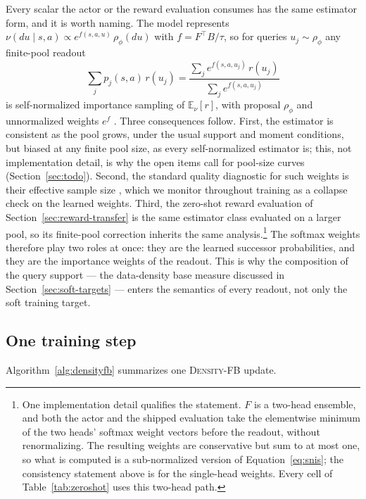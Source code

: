 \documentclass{article}
\newcommand{\E}{\mathbb{E}}
\newcommand{\DensityFB}{\textsc{Density-FB}}
\begin{document}
Every scalar the actor or the reward evaluation consumes has the same estimator form, and it is worth naming.
The model represents $\nu(du\mid s,a) \propto e^{f(s,a,u)}\,\rho_\phi(du)$ with $f=F^\top B/\tau$, so for queries $u_j\sim\rho_\phi$ any finite-pool readout
\begin{equation}
\label{eq:snis}
\sum_j p_j(s,a)\, r(u_j)
=
\frac{ \sum_j e^{f(s,a,u_j)}\, r(u_j) }{ \sum_j e^{f(s,a,u_j)} }
\end{equation}
is self-normalized importance sampling of $\E_{\nu}[r]$, with proposal $\rho_\phi$ and unnormalized weights $e^{f}$ \citep{owen2013mc}.
Three consequences follow.
First, the estimator is consistent as the pool grows, under the usual support and moment conditions, but biased at any finite pool size, as every self-normalized estimator is; this, not implementation detail, is why the open items call for pool-size curves (Section~\ref{sec:todo}).
Second, the standard quality diagnostic for such weights is their effective sample size \citep{kong1992ess}, which we monitor throughout training as a collapse check on the learned weights.
Third, the zero-shot reward evaluation of Section~\ref{sec:reward-transfer} is the same estimator class evaluated on a larger pool, so its finite-pool correction inherits the same analysis.\footnote{One implementation detail qualifies the statement. $F$ is a two-head ensemble, and both the actor and the shipped evaluation take the elementwise minimum of the two heads' softmax weight vectors before the readout, without renormalizing. The resulting weights are conservative but sum to at most one, so what is computed is a sub-normalized version of Equation~\ref{eq:snis}; the consistency statement above is for the single-head weights. Every cell of Table~\ref{tab:zeroshot} uses this two-head path.}
The softmax weights therefore play two roles at once: they are the learned successor probabilities, and they are the importance weights of the readout.
This is why the composition of the query support --- the data-density base measure discussed in Section~\ref{sec:soft-targets} --- enters the semantics of every readout, not only the soft training target.

\subsection{One training step}
Algorithm~\ref{alg:densityfb} summarizes one \DensityFB{} update.
\end{document}
